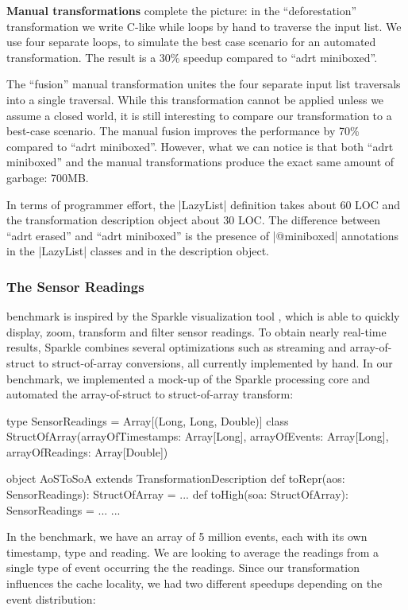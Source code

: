 \vspace{0.5em}
\noindent
\textbf{Manual transformations} complete the picture: in the ``deforestation'' transformation we write C-like while loops by hand to traverse the input list. We use four separate loops, to simulate the best case scenario for an automated transformation. The result is a 30\% speedup compared to ``adrt miniboxed''.

The ``fusion'' manual transformation unites the four separate input list traversals into a single traversal. While this transformation cannot be applied unless we assume a closed world, it is still interesting to compare our transformation to a best-case scenario. The manual fusion improves the performance by 70\% compared to ``adrt miniboxed''. However, what we can notice is that both ``adrt miniboxed'' and the manual transformations produce the exact same amount of garbage: 700MB.

In terms of programmer effort, the |LazyList| definition takes about 60 LOC and the transformation description object about 30 LOC. The difference between ``adrt erased'' and ``adrt miniboxed'' is the presence of |@miniboxed| annotations in the |LazyList| classes and in the description object.

\subsubsection{The Sensor Readings} benchmark is inspired by the Sparkle visualization tool \cite{sparkle}, which is able to quickly display, zoom, transform and filter sensor readings. To obtain nearly real-time results, Sparkle combines several optimizations such as streaming and array-of-struct to struct-of-array conversions, all currently implemented by hand. In our benchmark, we implemented a mock-up of the Sparkle processing core and automated the array-of-struct to struct-of-array transform:

\begin{lstlisting-nobreak}
type SensorReadings = Array[(Long, Long, Double)]
class StructOfArray(arrayOfTimestamps: Array[Long],
                           arrayOfEvents:     Array[Long],
                           arrayOfReadings:   Array[Double])

object AoSToSoA extends TransformationDescription {
  def toRepr(aos: SensorReadings): StructOfArray = ...
  def toHigh(soa: StructOfArray): SensorReadings = ...
  ...
}
\end{lstlisting-nobreak}

In the benchmark, we have an array of 5 million events, each with its own timestamp, type and reading. We are looking to average the readings from a single type of event occurring the the readings. Since our transformation influences the cache locality, we had two different speedups depending on the event distribution:

